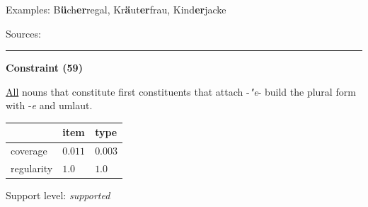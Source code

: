 \vspace{0.3em}

\noindent
Examples: B\textbf{ü}ch\textbf{er}regal, Kr\textbf{ä}ut\textbf{er}frau, Kind\textbf{er}jacke

\vspace{0.3em}

\noindent
Sources: \citet[98]{ortner_mueller-bollhagen_1991}


\hrule




\vspace{0.4em}

\begin{center}
\textbf{Constraint (59)}
\end{center}

\noindent
\underline{All} nouns that constitute first constituents that attach -\textit{"e}- build the plural form with -\textit{e} and umlaut.

\newpage

\vspace{0.35em}


\vspace{-0.35em}

\begin{table}[!ht]
\begin{center}

\begin{tabularx}{\columnwidth}{|X|X|X|}
\hline
 & item & type \\
\hline
 coverage & $0.011$ & $0.003$ \\
\hline
 regularity & $1.0$ & $1.0$ \\
\hline
\end{tabularx}
\end{center}
\end{table}

\vspace{-1.35em}

\noindent
Support level: \textit{supported}

